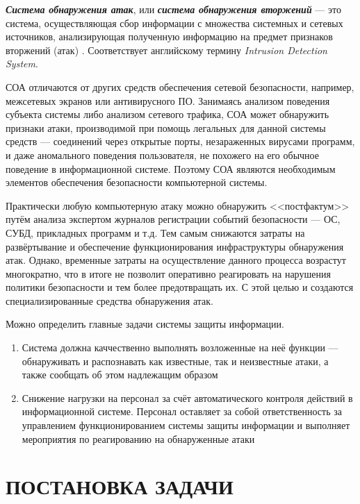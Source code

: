 \textit{\textbf{Система обнаружения атак}}, или \textit{\textbf{система обнаружения вторжений}} --- это система, осуществляющая сбор информации с множества системных и сетевых источников, анализирующая полученную информацию на предмет признаков вторжений (атак) \cite{bib:ids}. Соответствует английскому термину \textit{Intrusion Detection System}.

СОА отличаются от других средств обеспечения сетевой безопасности, например, межсетевых экранов или антивирусного ПО. Занимаясь анализом поведения субъекта системы либо анализом сетевого трафика, СОА может обнаружить признаки атаки, производимой при помощь легальных для данной системы средств --- соединений через открытые порты, незараженных вирусами программ, и даже аномального поведения пользователя, не похожего на его обычное поведение в информационной системе. Поэтому СОА являются необходимым элементов обеспечения безопасности компьютерной системы.

Практически любую компьютерную атаку можно обнаружить <<постфактум>> путём анализа экспертом журналов регистрации событий безопасности --- ОС, СУБД, прикладных программ и т.д. Тем самым снижаются затраты на развёртывание и обеспечение функционирования инфраструктуры обнаружения атак. Однако, временные затраты на осуществление данного процесса возрастут многократно, что в итоге не позволит оперативно реагировать на нарушения политики безопасности и тем более предотвращать их. С этой целью и создаются специализированные средства обнаружения атак.

Можно определить главные задачи системы защиты информации.

\begin{enumerate}

\item Система должна каччественно выполнять возложенные на неё функции --- обнаруживать и распознавать как известные, так и неизвестные атаки, а также сообщать об этом надлежащим образом

\item Снижение нагрузки на персонал за счёт автоматического контроля действий в информационной системе. Персонал оставляет за собой ответственность за управлением функционированием системы защиты информации и выполняет мероприятия по реагированию на обнаруженные атаки

\end{enumerate}


\section{ПОСТАНОВКА ЗАДАЧИ}

